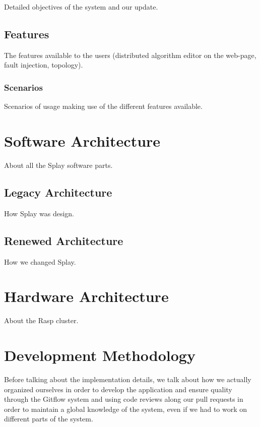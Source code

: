 \documentclass{eplmastersthesis}
\begin{document}
      Detailed objectives of the system and our update.

    \section{Features}

      The features available to the users (distributed algorithm editor on the
      web-page, fault injection, topology).

      \subsection{Scenarios}

        Scenarios of usage making use of the different features available.


  \chapter{Software Architecture}

    About all the Splay software parts.

    \section{Legacy Architecture}

      How Splay was design.

    \section{Renewed Architecture}

      How we changed Splay.

  \chapter{Hardware Architecture}

    About the Rasp cluster.

  \chapter{Development Methodology}

    Before talking about the implementation details, we talk about how we actually
    organized ourselves in order to develop the application and ensure quality
    through the Gitflow system and using code reviews along our pull requests
    in order to maintain a global knowledge of the system, even if we had to work
    on different parts of the system.
\end{document}
